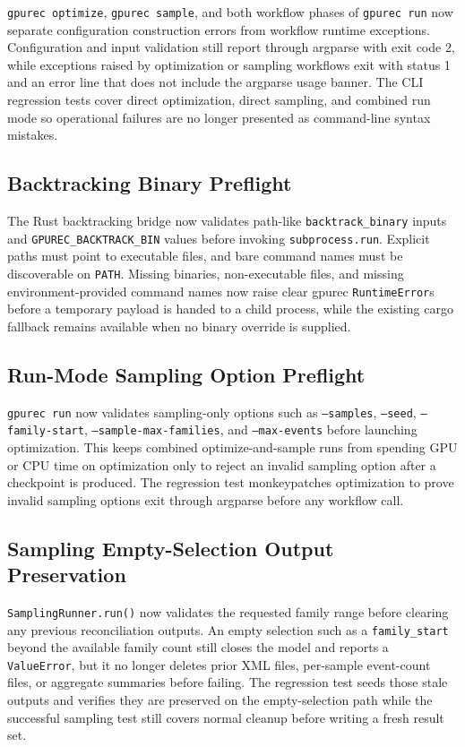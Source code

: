 \documentclass[11pt]{article}
\begin{document}
\texttt{gpurec optimize}, \texttt{gpurec sample}, and both workflow phases of
\texttt{gpurec run} now separate configuration construction errors from
workflow runtime exceptions.  Configuration and input validation still report
through argparse with exit code 2, while exceptions raised by optimization or
sampling workflows exit with status 1 and an error line that does not include
the argparse usage banner.  The CLI regression tests cover direct
optimization, direct sampling, and combined run mode so operational failures
are no longer presented as command-line syntax mistakes.

\subsection{Backtracking Binary Preflight}

The Rust backtracking bridge now validates path-like \texttt{backtrack\_binary}
inputs and \texttt{GPUREC\_BACKTRACK\_BIN} values before invoking
\texttt{subprocess.run}.  Explicit paths must point to executable files, and
bare command names must be discoverable on \texttt{PATH}.  Missing binaries,
non-executable files, and missing environment-provided command names now raise
clear gpurec \texttt{RuntimeError}s before a temporary payload is handed to a
child process, while the existing cargo fallback remains available when no
binary override is supplied.

\subsection{Run-Mode Sampling Option Preflight}

\texttt{gpurec run} now validates sampling-only options such as
\texttt{--samples}, \texttt{--seed}, \texttt{--family-start},
\texttt{--sample-max-families}, and \texttt{--max-events} before launching
optimization.  This keeps combined optimize-and-sample runs from spending GPU
or CPU time on optimization only to reject an invalid sampling option after a
checkpoint is produced.  The regression test monkeypatches optimization to
prove invalid sampling options exit through argparse before any workflow call.

\subsection{Sampling Empty-Selection Output Preservation}

\texttt{SamplingRunner.run()} now validates the requested family range before
clearing any previous reconciliation outputs.  An empty selection such as a
\texttt{family\_start} beyond the available family count still closes the model
and reports a \texttt{ValueError}, but it no longer deletes prior XML files,
per-sample event-count files, or aggregate summaries before failing.  The
regression test seeds those stale outputs and verifies they are preserved on
the empty-selection path while the successful sampling test still covers normal
cleanup before writing a fresh result set.
\end{document}
